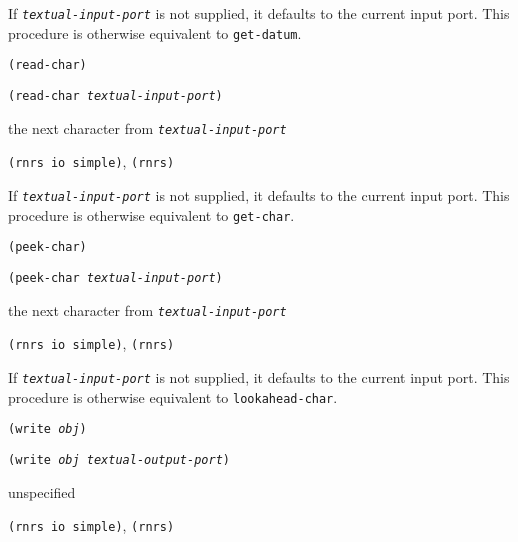 If \texttt{\textit{textual-input-port}} is not supplied, it defaults to the current input port.
This procedure is otherwise equivalent to \texttt{get-datum}.


\begin{description}

\label{io_s82}\item[procedure] \texttt{(read-char)}



\item[procedure] \texttt{(read-char \textit{textual-input-port})}



\item[returns] the next character from \texttt{\textit{textual-input-port}}


\item[libraries] \texttt{(rnrs io simple)}, \texttt{(rnrs)}
\end{description}


If \texttt{\textit{textual-input-port}} is not supplied, it defaults to the current input port.
This procedure is otherwise equivalent to \texttt{get-char}.


\begin{description}

\label{io_s83}\item[procedure] \texttt{(peek-char)}



\item[procedure] \texttt{(peek-char \textit{textual-input-port})}



\item[returns] the next character from \texttt{\textit{textual-input-port}}


\item[libraries] \texttt{(rnrs io simple)}, \texttt{(rnrs)}
\end{description}


If \texttt{\textit{textual-input-port}} is not supplied, it defaults to the current input port.
This procedure is otherwise equivalent to \texttt{lookahead-char}.


\begin{description}

\label{io_s84}\item[procedure] \texttt{(write \textit{obj})}



\item[procedure] \texttt{(write \textit{obj} \textit{textual-output-port})}



\item[returns] unspecified


\item[libraries] \texttt{(rnrs io simple)}, \texttt{(rnrs)}
\end{description}


